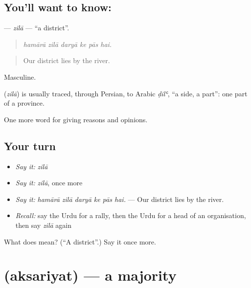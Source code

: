\subsection*{You'll want to know: }
\textbf{} — \emph{zilā} — \textquotedblleft{}a district\textquotedblright{}.

\begin{quote}
     
\end{quote}

\begin{quote}
\emph{hamārā zilā daryā ke pās hai.}
\end{quote}

\begin{quote}
Our district lies by the river.
\end{quote}

Masculine.

\begin{cousinweb}
\textbf{} (\emph{zilā}) is usually traced, through Persian, to Arabic \emph{ḍilʿ}, \textquotedblleft{}a side, a part\textquotedblright{}: one part of a province.
\end{cousinweb}

\begin{grammarlens}[title={What you've built}]
One more word for giving reasons and opinions.
\end{grammarlens}

\subsection*{Your turn}
\begin{itemize}
\raggedright
  \item \emph{Say it:} \emph{zilā}
  \item \emph{Say it:} \emph{zilā}, once more
  \item \emph{Say it:} \emph{hamārā zilā daryā ke pās hai.} — Our district lies by the river.
  \item \emph{Recall:} say the Urdu for a rally, then the Urdu for a head of an organisation, then say \emph{zilā} again
\end{itemize}

\begin{tcolorbox}[breakable,colback=teal!4,colframe=teal!35!black,title={Before you move on}]
What does  mean? (\textquotedblleft{}A district\textquotedblright{}.) Say it once more.
\end{tcolorbox}
\section[\texorpdfstring{\ur{اکثریت} (aksariyat)}{اکثریت (aksariyat)}]{ (aksariyat) — a majority}

